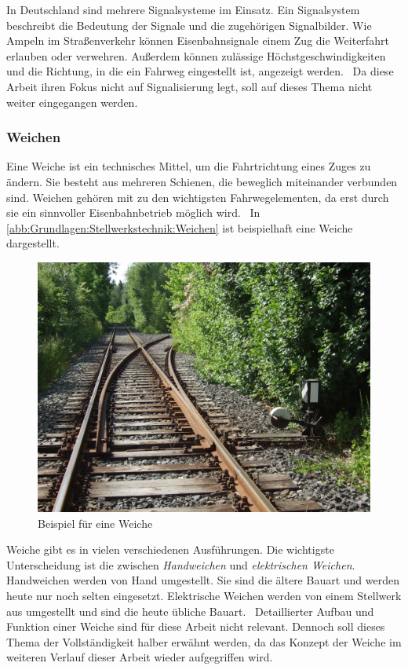 In Deutschland sind mehrere Signalsysteme im Einsatz. Ein Signalsystem beschreibt die Bedeutung der Signale und die zugehörigen Signalbilder. Wie Ampeln im Straßenverkehr können Eisenbahnsignale einem Zug die Weiterfahrt erlauben oder verwehren. Außerdem können zulässige Höchstgeschwindigkeiten und die Richtung, in die ein Fahrweg eingestellt ist, angezeigt werden.~\cite[][S.78 ff.]{bib:Sicherung-des-Schienenverkehrs} Da diese Arbeit ihren Fokus nicht auf Signalisierung legt, soll auf dieses Thema nicht weiter eingegangen werden.

\subsubsection*{Weichen}\label{text:Grundlagen:Stellwerkstechnik:Sicherung-des-Schienenverkehrs:Weichen}

Eine Weiche ist ein technisches Mittel, um die Fahrtrichtung eines Zuges zu ändern. Sie besteht aus mehreren Schienen, die beweglich miteinander verbunden sind. Weichen gehören mit zu den wichtigsten Fahrwegelementen, da erst durch sie ein sinnvoller Eisenbahnbetrieb möglich wird.~\cite[][S.64 ff.]{bib:Sicherung-des-Schienenverkehrs} In \autoref{abb:Grundlagen:Stellwerkstechnik:Weichen} ist beispielhaft eine Weiche dargestellt.

\begin{figure}[H]
    \centering
    \includegraphics[width=.6\textwidth]{Assets/Images/2-Grundlagen/Handweiche.jpg}
    \caption{Beispiel für eine Weiche~\cite{bib:bild:wiki:Handweiche}}\label{abb:Grundlagen:Stellwerkstechnik:Weichen}
\end{figure}

Weiche gibt es in vielen verschiedenen Ausführungen. Die wichtigste Unterscheidung ist die zwischen \textit{Handweichen} und \textit{elektrischen Weichen}. Handweichen werden von Hand umgestellt. Sie sind die ältere Bauart und werden heute nur noch selten eingesetzt. Elektrische Weichen werden von einem Stellwerk aus umgestellt und sind die heute übliche Bauart.~\cite[][S.71 ff.]{bib:Sicherung-des-Schienenverkehrs} Detaillierter Aufbau und Funktion einer Weiche sind für diese Arbeit nicht relevant. Dennoch soll dieses Thema der Vollständigkeit halber erwähnt werden, da das Konzept der Weiche im weiteren Verlauf dieser Arbeit wieder aufgegriffen wird.

